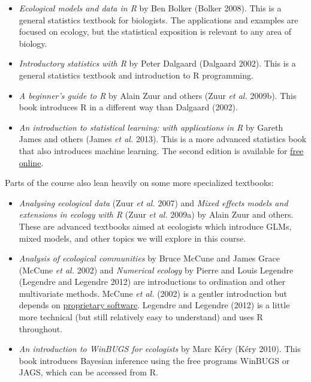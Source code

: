 \documentclass[
  13,
  letterpaper,
]{report}
\begin{document}
\begin{itemize}
\item
  \emph{Ecological models and data in R} by Ben Bolker (Bolker 2008).
  This is a general statistics textbook for biologists. The applications
  and examples are focused on ecology, but the statistical exposition is
  relevant to any area of biology.
\item
  \emph{Introductory statistics with R} by Peter Dalgaard (Dalgaard
  2002). This is a general statistics textbook and introduction to R
  programming.
\item
  \emph{A beginner's guide to R} by Alain Zuur and others (Zuur \emph{et
  al.} 2009b). This book introduces R in a different way than Dalgaard
  (2002).
\item
  \emph{An introduction to statistical learning: with applications in R}
  by Gareth James and others (James \emph{et al.} 2013). This is a more
  advanced statistics book that also introduces machine learning. The
  second edition is available for
  \href{https://www.statlearning.com/}{free online}.
\end{itemize}

Parts of the course also lean heavily on some more specialized
textbooks:

\begin{itemize}
\item
  \emph{Analysing ecological data} (Zuur \emph{et al.} 2007) and
  \emph{Mixed effects models and extensions in ecology with R} (Zuur
  \emph{et al.} 2009a) by Alain Zuur and others. These are advanced
  textbooks aimed at ecologists which introduce GLMs, mixed models, and
  other topics we will explore in this course.
\item
  \emph{Analysis of ecological communities} by Bruce McCune and James
  Grace (McCune \emph{et al.} 2002) and \emph{Numerical ecology} by
  Pierre and Louis Legendre (Legendre and Legendre 2012) are
  introductions to ordination and other multivariate methods. McCune
  \emph{et al.} (2002) is a gentler introduction but depends on
  \href{https://www.wildblueberrymedia.net/pcord}{proprietary software}.
  Legendre and Legendre (2012) is a little more technical (but still
  relatively easy to understand) and uses R throughout.
\item
  \emph{An introduction to WinBUGS for ecologists} by Marc Kéry (Kéry
  2010). This book introduces Bayesian inference using the free programs
  WinBUGS or JAGS, which can be accessed from R.
\end{itemize}
\end{document}

